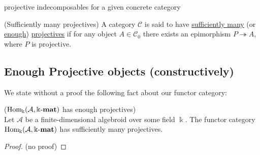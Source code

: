 projective indecomposables for a given concrete category

\begin{definition}{(Sufficiently many projectives)}\label{def:enough_projectives}
A category $\mathcal{C}$ is said to have \ul{sufficiently many} (or \ul{enough}) \ul{projectives} if for any object $A \in \mathcal{C}_{0}$
there exists an epimorphism $P \twoheadrightarrow A$, where $P$ is projective.
\end{definition}

\subsection{Enough Projective objects (constructively)}

We state without a proof the following fact about our functor category:

\begin{theorem}{($\mathrm{Hom_{\Bbbk}}(\mathcal{A},\Bbbk\textnormal{-}\mathbf{mat})$ has enough projectives)}\\
Let $\mathcal{A}$ be a finite-dimensional algebroid over some field $\Bbbk$. The functor category $\mathrm{Hom_{\Bbbk}}(\mathcal{A},\Bbbk\textnormal{-}\mathbf{mat})$ has sufficiently many
projectives.
\end{theorem}
\begin{proof}
(no proof)
\end{proof}